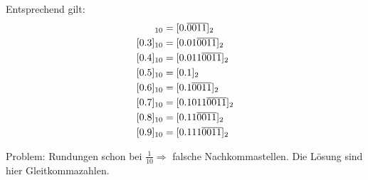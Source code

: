Entsprechend gilt:
\begin{align}
	[0.2]_{10} &= [0.\overline{0011}]_2 \notag \\
	[0.3]_{10} &= [0.01\overline{0011}]_2 \notag \\
	[0.4]_{10} &= [0.011\overline{0011}]_2 \notag \\
	[0.5]_{10} &= [0.1]_2 \notag \\
	[0.6]_{10} &= [0.1\overline{0011}]_2 \notag \\
	[0.7]_{10} &= [0.1011\overline{0011}]_2 \notag \\
	[0.8]_{10} &= [0.11\overline{0011}]_2 \notag \\
	[0.9]_{10} &= [0.111\overline{0011}]_2 \notag
\end{align}

Problem: Rundungen schon bei $\frac{1}{10}\Rightarrow$ falsche Nachkommastellen. Die Lösung sind hier Gleitkommazahlen.